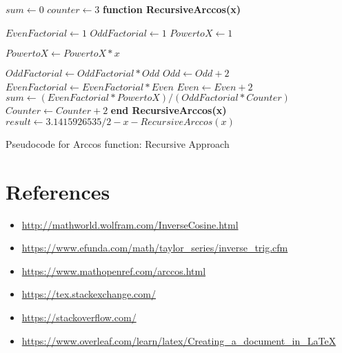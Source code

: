 \documentclass[12pt]{article}
\begin{document}
\begin{algorithm}
\SetAlgoLined
    $sum\gets 0$\;
    $counter\gets 3$\;
    \textbf{function RecursiveArccos(x)\;}
    
    
            $EvenFactorial\gets 1$\;
            $OddFactorial\gets 1$\;
            $PowertoX\gets 1$\;
        
            {
                $PowertoX\gets PowertoX * x$\; 
            }
            \EndFor
            
            {
                $OddFactorial \gets OddFactorial * Odd$\;
                $Odd \gets Odd + 2$\;
            }
            \EndFor
            {
                $EvenFactorial \gets EvenFactorial * Even$\;
                $Even \gets Even + 2$\;
            }
            \EndFor
            $sum \gets (EvenFactorial * PowertoX)/(OddFactorial * Counter)$\;
            $Counter \gets Counter +2$\; 
  \textbf{end RecursiveArccos(x)}\\
  $result \gets 3.1415926535/2- x - RecursiveArccos(x)$
\caption{Pseudocode for Arccos function: Recursive Approach}
\label{algorithm2}
\end{algorithm}

\newpage
\section{References}
\begin{itemize}
    \item \url{http://mathworld.wolfram.com/InverseCosine.html}
    \item \url{https://www.efunda.com/math/taylor_series/inverse_trig.cfm}
    \item \url{https://www.mathopenref.com/arccos.html}
    \item \url{https://tex.stackexchange.com/}
    \item \url{https://stackoverflow.com/}
    \item \url{https://www.overleaf.com/learn/latex/Creating_a_document_in_LaTeX}
\end{itemize}
\end{document}
